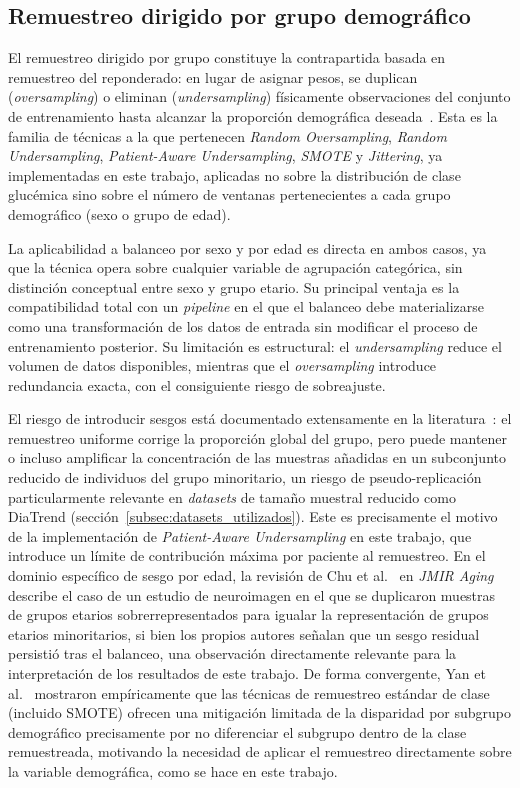 \subsection{Remuestreo dirigido por grupo demográfico}
\label{subsec:group_resampling}

El remuestreo dirigido por grupo constituye la contrapartida basada en remuestreo del reponderado: en lugar de asignar pesos, se duplican (\emph{oversampling}) o eliminan (\emph{undersampling}) físicamente observaciones del conjunto de entrenamiento hasta alcanzar la proporción demográfica deseada~\cite{fairmodels2021,kamiran2012data}. Esta es la familia de técnicas a la que pertenecen \emph{Random Oversampling}, \emph{Random Undersampling}, \emph{Patient-Aware Undersampling}, \emph{SMOTE} y \emph{Jittering}, ya implementadas en este trabajo, aplicadas no sobre la distribución de clase glucémica sino sobre el número de ventanas pertenecientes a cada grupo demográfico (sexo o grupo de edad).

La aplicabilidad a balanceo por sexo y por edad es directa en ambos casos, ya que la técnica opera sobre cualquier variable de agrupación categórica, sin distinción conceptual entre sexo y grupo etario. Su principal ventaja es la compatibilidad total con un \emph{pipeline} en el que el balanceo debe materializarse como una transformación de los datos de entrada sin modificar el proceso de entrenamiento posterior. Su limitación es estructural: el \emph{undersampling} reduce el volumen de datos disponibles, mientras que el \emph{oversampling} introduce redundancia exacta, con el consiguiente riesgo de sobreajuste.

El riesgo de introducir sesgos está documentado extensamente en la literatura~\cite{krasanakis2018reweighting,algorithmfairnessmedicine2021}: el remuestreo uniforme corrige la proporción global del grupo, pero puede mantener o incluso amplificar la concentración de las muestras añadidas en un subconjunto reducido de individuos del grupo minoritario, un riesgo de pseudo-replicación particularmente relevante en \emph{datasets} de tamaño muestral reducido como DiaTrend (sección~\ref{subsec:datasets_utilizados}). Este es precisamente el motivo de la implementación de \emph{Patient-Aware Undersampling} en este trabajo, que introduce un límite de contribución máxima por paciente al remuestreo. En el dominio específico de sesgo por edad, la revisión de Chu et al.~\cite{chu2024agebias} en \emph{JMIR Aging} describe el caso de un estudio de neuroimagen en el que se duplicaron muestras de grupos etarios sobrerrepresentados para igualar la representación de grupos etarios minoritarios, si bien los propios autores señalan que un sesgo residual persistió tras el balanceo, una observación directamente relevante para la interpretación de los resultados de este trabajo. De forma convergente, Yan et al.~\cite{yan2022doubleprioritized} mostraron empíricamente que las técnicas de remuestreo estándar de clase (incluido SMOTE) ofrecen una mitigación limitada de la disparidad por subgrupo demográfico precisamente por no diferenciar el subgrupo dentro de la clase remuestreada, motivando la necesidad de aplicar el remuestreo directamente sobre la variable demográfica, como se hace en este trabajo.


